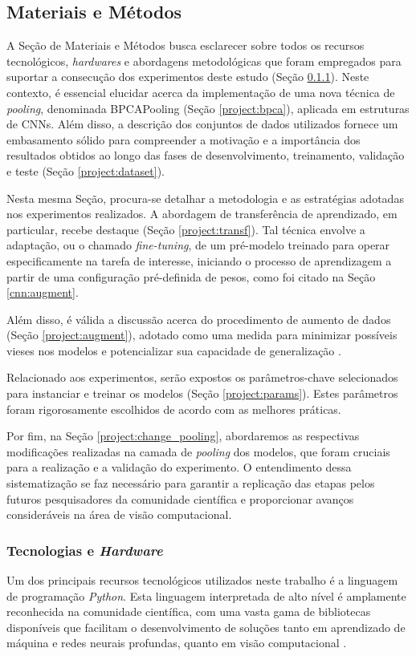 \subsection{Materiais e Métodos}
\label{project:matmet}
A Seção de Materiais e Métodos busca esclarecer sobre todos os recursos tecnológicos, \textit{hardwares} e abordagens metodológicas que foram empregados para suportar a consecução dos experimentos deste estudo (Seção \ref{project:techard}). Neste contexto, é essencial elucidar acerca da implementação de uma nova técnica de \textit{pooling}, denominada BPCAPooling (Seção \ref{project:bpca}), aplicada em estruturas de CNNs. Além disso, a descrição dos conjuntos de dados utilizados fornece um embasamento sólido para compreender a motivação e a importância dos resultados obtidos ao longo das fases de desenvolvimento, treinamento, validação e teste (Seção \ref{project:dataset}).

Nesta mesma Seção, procura-se detalhar a metodologia e as estratégias adotadas nos experimentos realizados. A abordagem de transferência de aprendizado, em particular, recebe destaque (Seção \ref{project:transf}). Tal técnica envolve a adaptação, ou o chamado \textit{fine-tuning}, de um pré-modelo treinado para operar especificamente na tarefa de interesse, iniciando o processo de aprendizagem a partir de uma configuração pré-definida de pesos, como foi citado na Seção \ref{cnn:augment}.

Além disso, é válida a discussão acerca do procedimento de aumento de dados (Seção \ref{project:augment}), adotado como uma medida para minimizar possíveis vieses nos modelos e potencializar sua capacidade de generalização \citep{Shorten2019ALearning}.

Relacionado aos experimentos, serão expostos os parâmetros-chave selecionados para instanciar e treinar os modelos (Seção \ref{project:params}). Estes parâmetros foram rigorosamente escolhidos de acordo com as melhores práticas.

Por fim, na Seção \ref{project:change_pooling}, abordaremos as respectivas modificações realizadas na camada de \textit{pooling} dos modelos, que foram cruciais para a realização e a validação do experimento. O entendimento dessa sistematização se faz necessário para garantir a replicação das etapas pelos futuros pesquisadores da comunidade científica e proporcionar avanços consideráveis na área de visão computacional.

\subsubsection{Tecnologias e \textit{Hardware}}
\label{project:techard}
Um dos principais recursos tecnológicos utilizados neste trabalho é a linguagem de programação \textit{Python}. Esta linguagem interpretada de alto nível é amplamente reconhecida na comunidade científica, com uma vasta gama de bibliotecas disponíveis que facilitam o desenvolvimento de soluções tanto em aprendizado de máquina e redes neurais profundas, quanto em visão computacional \citep{Millman2011PythonEngineers, Perkel2015Programming:Python}.

